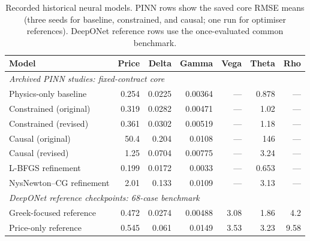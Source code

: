 \begin{table}[!ht]\centering\small\setlength{\tabcolsep}{4pt}
\caption{Recorded historical neural models. PINN rows show the saved core RMSE means (three seeds for baseline, constrained, and causal; one run for optimiser references). DeepONet reference rows use the once-evaluated common benchmark.}
\begin{tabular}{lrrrrrr}\toprule
Model & Price & Delta & Gamma & Vega & Theta & Rho\\
\midrule\multicolumn{7}{l}{\textit{Archived PINN studies: fixed-contract core}}\\
Physics-only baseline & 0.254 & 0.0225 & 0.00364 & --- & 0.878 & ---\\
Constrained (original) & 0.319 & 0.0282 & 0.00471 & --- & 1.02 & ---\\
Constrained (revised) & 0.361 & 0.0302 & 0.00519 & --- & 1.18 & ---\\
Causal (original) & 50.4 & 0.204 & 0.0108 & --- & 146 & ---\\
Causal (revised) & 1.25 & 0.0704 & 0.00775 & --- & 3.24 & ---\\
L-BFGS refinement & 0.199 & 0.0172 & 0.0033 & --- & 0.653 & ---\\
NysNewton--CG refinement & 2.01 & 0.133 & 0.0109 & --- & 3.13 & ---\\
\midrule\multicolumn{7}{l}{\textit{DeepONet reference checkpoints: 68-case benchmark}}\\
Greek-focused reference & 0.472 & 0.0274 & 0.00488 & 3.08 & 1.86 & 4.2\\
Price-only reference & 0.545 & 0.061 & 0.0149 & 3.53 & 3.23 & 9.58\\
\bottomrule\end{tabular}\end{table}

